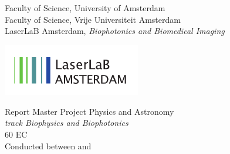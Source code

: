 \begin{titlepage}
    \begin{center}

        \vfill

        \begingroup
        \centering
        \endgroup


         \bigskip

        Faculty of Science, University of Amsterdam \\
        Faculty of Science, Vrije Universiteit Amsterdam \\ \smallskip
        LaserLaB Amsterdam, \emph{Biophotonics and Biomedical Imaging}

        \vfill

        \includegraphics[width=6cm]{frontbackmatter/images/laserlab-logo.pdf}

        \vfill

        Report Master Project Physics and Astronomy \\
        \emph{track Biophysics and Biophotonics} \\
        60 EC \\
        Conducted between  and 


\end{center}
\end{titlepage}
